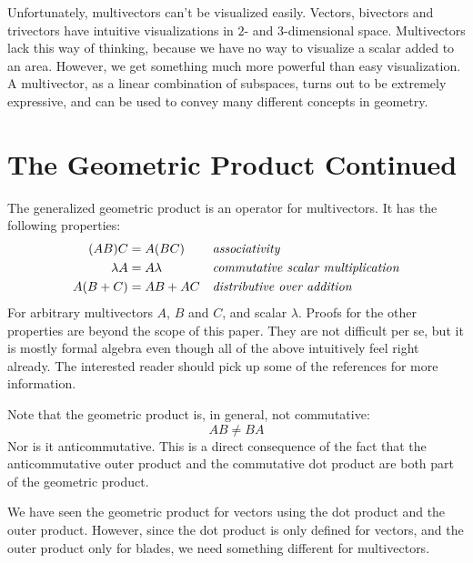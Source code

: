 \documentclass[10pt]{report}
\begin{document}
Unfortunately, multivectors can't be visualized easily. Vectors,
bivectors and trivectors have intuitive visualizations in $2$- and
$3$-dimensional space. Multivectors lack this way of thinking,
because we have no way to visualize a scalar added to an area.
However, we get something much more powerful than easy
visualization. A multivector, as a linear combination of
subspaces, turns out to be extremely expressive, and can be used
to convey many different concepts in geometry.

\section{The Geometric Product Continued}

The generalized geometric product is an operator for multivectors.
It has the following properties:
\begin{align}
(AB)C     &= A(BC) && \text{\emph{associativity}} \label{eq:geom prod associative} \\
\lambda A &= A\lambda && \text{\emph{commutative scalar multiplication}} \label{eq:geom prod commutative}\\
A(B+C)    &= AB + AC && \text{\emph{distributive over
addition}\label{eq:geom prod distributive}}
\end{align}
For arbitrary multivectors $A$, $B$ and $C$, and scalar $\lambda$.
Proofs for the other properties are beyond the scope of this
paper. They are not difficult per se, but it is mostly formal
algebra even though all of the above intuitively feel right
already. The interested reader should pick up some of the
references for more information.

Note that the geometric product is, in general, not commutative:
\begin{displaymath}
AB \neq BA
\end{displaymath}
Nor is it anticommutative. This is a direct consequence of the
fact that the anticommutative outer product and the commutative
dot product are both part of the geometric product.

We have seen the geometric product for vectors using the dot
product and the outer product. However, since the dot product is
only defined for vectors, and the outer product only for blades,
we need something different for multivectors.
\end{document}
